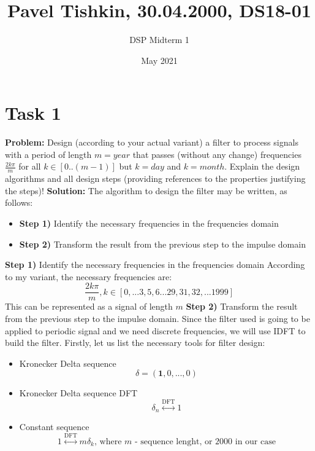 \documentclass{article}
\title{Pavel Tishkin, 30.04.2000, DS18-01}
\author{DSP Midterm 1}
\date{May 2021}
\begin{document}
\maketitle
\section{Task 1}
\textbf{Problem:}
Design (according to your actual variant) a filter to process signals with a period of length $m=year$ that passes (without any change) frequencies $\frac{2k\pi}{m}$ for all $k \in [0..(m-1)]$ but $k=day$ and $k=month$. Explain the design algorithms and all design steps (providing references to the properties justifying the steps)!
\newline
\textbf{Solution:}
\newline
The algorithm to design the filter may be written, as follows:
\begin{itemize}
    \item \textbf{Step 1)} Identify the necessary frequencies in the frequencies domain
    \item \textbf{Step 2)} Transform the result from the previous step to the impulse domain
\end{itemize}
\newline
\newline
\textbf{Step 1)} Identify the necessary frequencies in the frequencies domain
According to my variant, the necessary frequencies are:
$$\frac{2k\pi}{m}, k\in [0, ... 3, 5, 6 ... 29, 31, 32, ... 1999]$$
This can be represented as a signal of length $m$
\newline
\newline
\textbf{Step 2)} Transform the result from the previous step to the impulse domain.
\newline
Since the filter used is going to be applied to periodic signal and we need discrete frequencies, we will use IDFT to build the filter. Firstly, let us list the necessary tools for filter design:
\begin{itemize}
    \item Kronecker Delta sequence
    \begin{equation}
    \label{eqn:delta}
        \delta = (\mathbf{1}, 0, ..., 0)
    \end{equation}
    \item Kronecker Delta sequence DFT
    \begin{equation}
    \label{eqn:deltaDFT}
        \delta_n \stackrel{\mathrm{DFT}}{\longleftrightarrow} 1
    \end{equation}
    \item Constant sequence
    \begin{equation}
    \label{eqn:const}
        1 \stackrel{\mathrm{DFT}}{\longleftrightarrow} m\delta_k \text{, where $m$ - sequence lenght, or $2000$ in our case}
    \end{equation}
\end{itemize}
\end{document}
